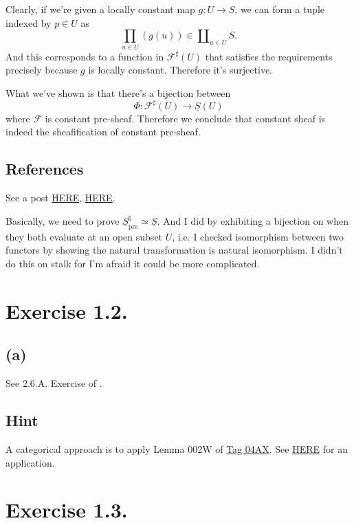 Clearly, if we're given a locally constant map $g:U\to S$, we can form a tuple indexed by $p\in U$ as
\[\prod_{u\in U} (g(u))\in \amalg_{u\in U}S.\] And this corresponds to a function in $\mathscr F^{\sharp}(U)$ that satisfies the requirements precisely because $g$ is locally constant. Therefore it's surjective.

What we've shown is that there's a bijection between 
\[\Phi:\mathscr F^{\sharp}(U)\to\underline{S}(U)\] where $\mathscr F$ is constant pre-sheaf. Therefore we conclude that constant sheaf is indeed the sheafification of constant pre-sheaf.

\subsection{References}

See a post \href{https://math.stackexchange.com/questions/249961/sheafification-of-the-constant-presheaf}{HERE}, \href{https://math.stackexchange.com/questions/3834390/sheafification-of-constant-presheaf}{HERE}.

Basically, we need to prove $\underline{S}_{\text{pre}}^{\sharp}\simeq \underline{S}$. And I did by exhibiting a bijection on when they both evaluate at an open subset $U$, i.e. I checked isomorphism between two functors by showing the natural transformation is natural isomorphism.
I didn't do this on stalk for I'm afraid it could be more complicated.

\section{Exercise 1.2.}

\subsection{(a)}

See 2.6.A. Exercise  of \cite{RaviRisingSea}.

\subsection{Hint}

A categorical approach is to apply Lemma 002W of \href{https://stacks.math.columbia.edu/tag/04AX}{Tag 04AX}. See \href{https://math.stackexchange.com/questions/1561820/exact-sequence-of-sheaves-if-and-only-if-exact-on-the-stalks}{HERE} for an application.

\section{Exercise 1.3.}

